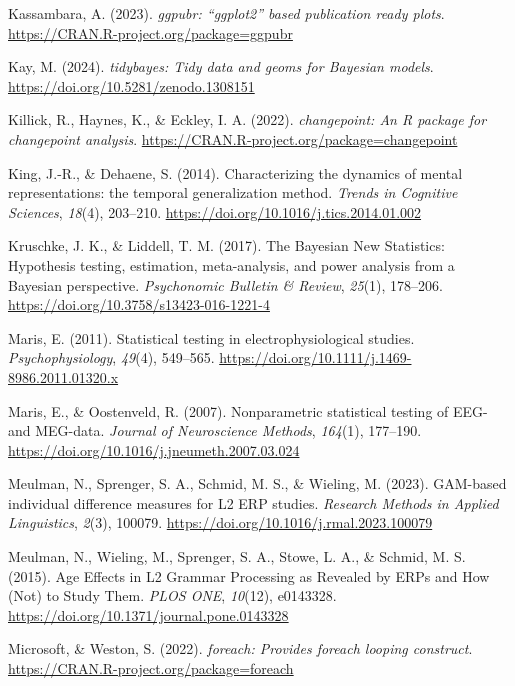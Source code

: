 \documentclass[
  doc,
  floatsintext,
  longtable,
  a4paper,
  nolmodern,
  notxfonts,
  notimes,
  colorlinks=true,linkcolor=blue,citecolor=blue,urlcolor=blue]{apa7}
\newlength{\cslhangindent}
\newenvironment{CSLReferences}[2] %
 {\begin{list}{}{%
  \setlength{\itemindent}{0pt}
  \setlength{\leftmargin}{0pt}
  \setlength{\parsep}{0pt}
  \ifodd #1
   \setlength{\leftmargin}{\cslhangindent}
   \setlength{\itemindent}{-1\cslhangindent}
  \fi
  \setlength{\itemsep}{#2\baselineskip}}}
 {\end{list}}
\begin{document}
\begin{CSLReferences}{1}{0}
Kassambara, A. (2023). \emph{{ggpubr}: {``{ggplot2}''} based publication
ready plots}. \url{https://CRAN.R-project.org/package=ggpubr}

Kay, M. (2024). \emph{{tidybayes}: Tidy data and geoms for {Bayesian}
models}. \url{https://doi.org/10.5281/zenodo.1308151}

Killick, R., Haynes, K., \& Eckley, I. A. (2022). \emph{{changepoint}:
An {R} package for changepoint analysis}.
\url{https://CRAN.R-project.org/package=changepoint}

King, J.-R., \& Dehaene, S. (2014). Characterizing the dynamics of
mental representations: the temporal generalization method. \emph{Trends
in Cognitive Sciences}, \emph{18}(4), 203--210.
\url{https://doi.org/10.1016/j.tics.2014.01.002}

Kruschke, J. K., \& Liddell, T. M. (2017). The Bayesian New Statistics:
Hypothesis testing, estimation, meta-analysis, and power analysis from a
Bayesian perspective. \emph{Psychonomic Bulletin \& Review},
\emph{25}(1), 178--206. \url{https://doi.org/10.3758/s13423-016-1221-4}

Maris, E. (2011). Statistical testing in electrophysiological studies.
\emph{Psychophysiology}, \emph{49}(4), 549--565.
\url{https://doi.org/10.1111/j.1469-8986.2011.01320.x}

Maris, E., \& Oostenveld, R. (2007). Nonparametric statistical testing
of EEG- and MEG-data. \emph{Journal of Neuroscience Methods},
\emph{164}(1), 177--190.
\url{https://doi.org/10.1016/j.jneumeth.2007.03.024}

Meulman, N., Sprenger, S. A., Schmid, M. S., \& Wieling, M. (2023).
GAM-based individual difference measures for L2 ERP studies.
\emph{Research Methods in Applied Linguistics}, \emph{2}(3), 100079.
\url{https://doi.org/10.1016/j.rmal.2023.100079}

Meulman, N., Wieling, M., Sprenger, S. A., Stowe, L. A., \& Schmid, M.
S. (2015). Age Effects in L2 Grammar Processing as Revealed by ERPs and
How (Not) to Study Them. \emph{PLOS ONE}, \emph{10}(12), e0143328.
\url{https://doi.org/10.1371/journal.pone.0143328}

Microsoft, \& Weston, S. (2022). \emph{{foreach}: Provides foreach
looping construct}. \url{https://CRAN.R-project.org/package=foreach}


\end{CSLReferences}
\end{document}
